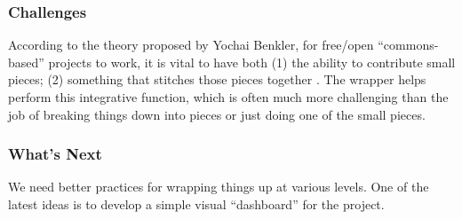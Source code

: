 \subsubsection*{Challenges} According to the theory proposed by Yochai Benkler,
for free/open ``commons-based'' projects to work, it is vital to have
both (1) the ability to contribute small pieces; (2) something that
stitches those pieces together \cite{coases-penguin}. The wrapper helps perform this
integrative function, which is often much more challenging than the job
of breaking things down into pieces or just doing one of the small
pieces.

\subsubsection*{What's Next}
We need better practices for wrapping things up at
various levels.  One of the latest ideas is to develop a simple visual
``dashboard'' for the project.

